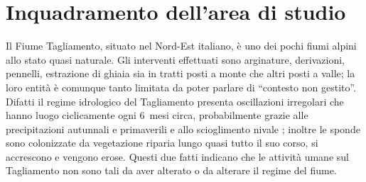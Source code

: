 

\section{Inquadramento dell'area di studio}
Il Fiume Tagliamento, situato nel Nord-Est italiano, è uno dei pochi fiumi alpini allo stato quasi naturale. 
Gli interventi effettuati sono arginature, derivazioni, pennelli, estrazione di ghiaia sia in tratti posti a monte che altri posti a valle; la loro entità è comunque tanto limitata da poter parlare di “contesto non gestito”.
Difatti il regime idrologico del Tagliamento presenta oscillazioni irregolari che hanno luogo ciclicamente ogni 6~mesi circa, probabilmente grazie alle precipitazioni autunnali e primaverili e allo scioglimento nivale ; inoltre le sponde sono colonizzate da vegetazione riparia lungo quasi tutto il suo corso, si accrescono e vengono erose. 
Questi due fatti indicano che le attività umane sul Tagliamento non sono tali da aver alterato o da alterare il regime del fiume.


